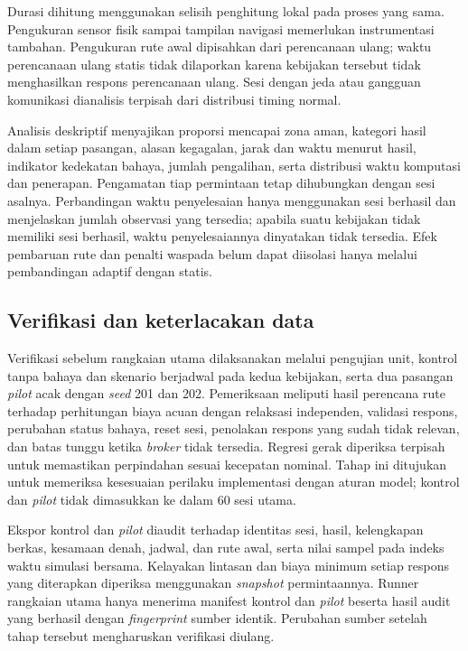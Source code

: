 \documentclass[10pt,a4paper]{article}
\begin{document}
Durasi dihitung menggunakan selisih penghitung lokal pada proses yang sama. Pengukuran sensor fisik sampai tampilan navigasi memerlukan instrumentasi tambahan. Pengukuran rute awal dipisahkan dari perencanaan ulang; waktu perencanaan ulang statis tidak dilaporkan karena kebijakan tersebut tidak menghasilkan respons perencanaan ulang. Sesi dengan jeda atau gangguan komunikasi dianalisis terpisah dari distribusi timing normal.

Analisis deskriptif menyajikan proporsi mencapai zona aman, kategori hasil dalam setiap pasangan, alasan kegagalan, jarak dan waktu menurut hasil, indikator kedekatan bahaya, jumlah pengalihan, serta distribusi waktu komputasi dan penerapan. Pengamatan tiap permintaan tetap dihubungkan dengan sesi asalnya. Perbandingan waktu penyelesaian hanya menggunakan sesi berhasil dan menjelaskan jumlah observasi yang tersedia; apabila suatu kebijakan tidak memiliki sesi berhasil, waktu penyelesaiannya dinyatakan tidak tersedia. Efek pembaruan rute dan penalti waspada belum dapat diisolasi hanya melalui pembandingan adaptif dengan statis.

\subsection*{Verifikasi dan keterlacakan data}
Verifikasi sebelum rangkaian utama dilaksanakan melalui pengujian unit, kontrol tanpa bahaya dan skenario berjadwal pada kedua kebijakan, serta dua pasangan \emph{pilot} acak dengan \emph{seed} 201 dan 202. Pemeriksaan meliputi hasil perencana rute terhadap perhitungan biaya acuan dengan relaksasi independen, validasi respons, perubahan status bahaya, reset sesi, penolakan respons yang sudah tidak relevan, dan batas tunggu ketika \emph{broker} tidak tersedia. Regresi gerak diperiksa terpisah untuk memastikan perpindahan sesuai kecepatan nominal. Tahap ini ditujukan untuk memeriksa kesesuaian perilaku implementasi dengan aturan model; kontrol dan \emph{pilot} tidak dimasukkan ke dalam 60 sesi utama.

Ekspor kontrol dan \emph{pilot} diaudit terhadap identitas sesi, hasil, kelengkapan berkas, kesamaan denah, jadwal, dan rute awal, serta nilai sampel pada indeks waktu simulasi bersama. Kelayakan lintasan dan biaya minimum setiap respons yang diterapkan diperiksa menggunakan \emph{snapshot} permintaannya. Runner rangkaian utama hanya menerima manifest kontrol dan \emph{pilot} beserta hasil audit yang berhasil dengan \emph{fingerprint} sumber identik. Perubahan sumber setelah tahap tersebut mengharuskan verifikasi diulang.
\end{document}
